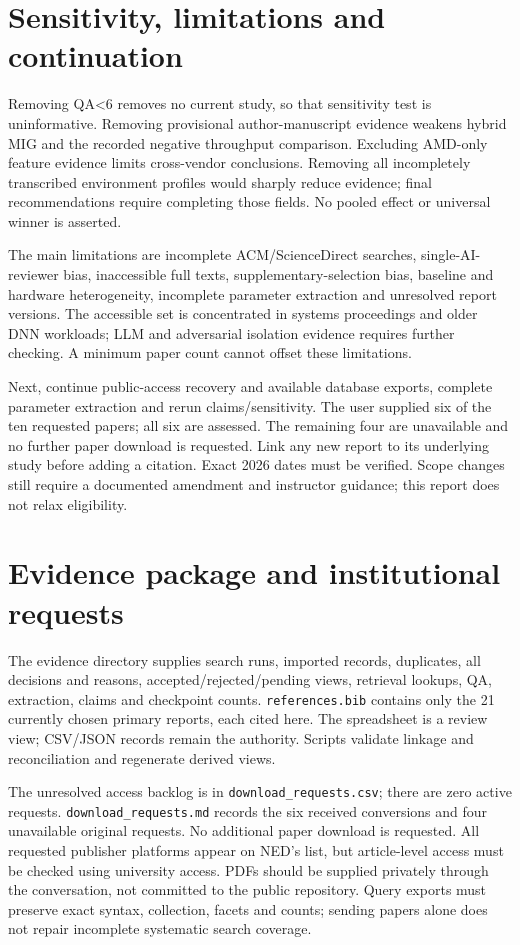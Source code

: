 \documentclass[12pt,a 4paper]{article}
\begin{document}
\section{Sensitivity, limitations and continuation}
Removing QA<6 removes no current study, so that sensitivity test is uninformative. Removing provisional author-manuscript evidence weakens hybrid MIG and the recorded negative throughput comparison. Excluding AMD-only feature evidence limits cross-vendor conclusions. Removing all incompletely transcribed environment profiles would sharply reduce evidence; final recommendations require completing those fields. No pooled effect or universal winner is asserted.

The main limitations are incomplete ACM/ScienceDirect searches, single-AI-reviewer bias, inaccessible full texts, supplementary-selection bias, baseline and hardware heterogeneity, incomplete parameter extraction and unresolved report versions. The accessible set is concentrated in systems proceedings and older DNN workloads; LLM and adversarial isolation evidence requires further checking. A minimum paper count cannot offset these limitations.

Next, continue public-access recovery and available database exports, complete parameter extraction and rerun claims/sensitivity. The user supplied six of the ten requested papers; all six are assessed. The remaining four are unavailable and no further paper download is requested. Link any new report to its underlying study before adding a citation. Exact 2026 dates must be verified. Scope changes still require a documented amendment and instructor guidance; this report does not relax eligibility.

\section{Evidence package and institutional requests}
The evidence directory supplies search runs, imported records, duplicates, all decisions and reasons, accepted/rejected/pending views, retrieval lookups, QA, extraction, claims and checkpoint counts. \texttt{references.bib} contains only the 21 currently chosen primary reports, each cited here. The spreadsheet is a review view; CSV/JSON records remain the authority. Scripts validate linkage and reconciliation and regenerate derived views.

The unresolved access backlog is in \texttt{download\_requests.csv}; there are zero active requests. \texttt{download\_requests.md} records the six received conversions and four unavailable original requests. No additional paper download is requested. All requested publisher platforms appear on NED's list, but article-level access must be checked using university access. PDFs should be supplied privately through the conversation, not committed to the public repository. Query exports must preserve exact syntax, collection, facets and counts; sending papers alone does not repair incomplete systematic search coverage.


\end{document}

